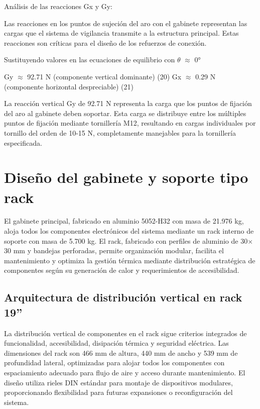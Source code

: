 \documentclass[12pt,a4paper,oneside]{report}
\begin{document}
Análisis de las reacciones Gx y Gy:

Las reacciones en los puntos de sujeción del aro con el gabinete representan las cargas que el sistema de vigilancia transmite a la estructura principal. Estas reacciones son críticas para el diseño de los refuerzos de conexión.

Sustituyendo valores en las ecuaciones de equilibrio con \ensuremath{\theta} \ensuremath{\approx} 0°

Gy \ensuremath{\approx} 92.71 N (componente vertical dominante) (20) Gx \ensuremath{\approx} 0.29 N (componente horizontal despreciable) (21)

La reacción vertical Gy de 92.71 N representa la carga que los puntos de fijación del aro al gabinete deben soportar. Esta carga se distribuye entre los múltiples puntos de fijación mediante tornillería M12, resultando en cargas individuales por tornillo del orden de 10-15 N, completamente manejables para la tornillería especificada.

\section{Diseño del gabinete y soporte tipo rack}\label{diseuxf1o-del-gabinete-y-soporte-tipo-rack}

El gabinete principal, fabricado en aluminio 5052-H32 con masa de 21.976 kg, aloja todos los componentes electrónicos del sistema mediante un rack interno de soporte con masa de 5.700 kg. El rack, fabricado con perfiles de aluminio de 30\ensuremath{\times}30 mm y bandejas perforadas, permite organización modular, facilita el mantenimiento y optimiza la gestión térmica mediante distribución estratégica de componentes según su generación de calor y requerimientos de accesibilidad.

\subsection{Arquitectura de distribución vertical en rack 19''}\label{arquitectura-de-distribuciuxf3n-vertical-en-rack-19}

La distribución vertical de componentes en el rack sigue criterios integrados de funcionalidad, accesibilidad, disipación térmica y seguridad eléctrica. Las dimensiones del rack son 466 mm de altura, 440 mm de ancho y 539 mm de profundidad lateral, optimizadas para alojar todos los componentes con espaciamiento adecuado para flujo de aire y acceso durante mantenimiento. El diseño utiliza rieles DIN estándar para montaje de dispositivos modulares, proporcionando flexibilidad para futuras expansiones o reconfiguración del sistema.
\end{document}
